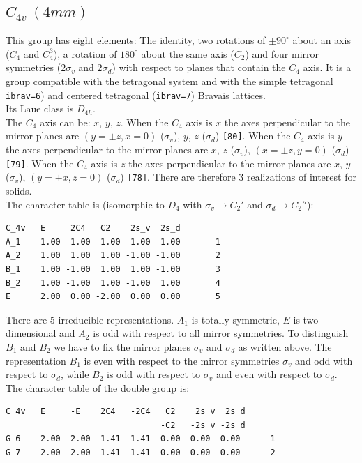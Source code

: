 \documentclass[12pt,a4paper]{article}
\begin{document}
\subsection{\color{web-blue}$C_{4v}\ (4mm)$} 
This group has eight elements: The identity, two rotations of $\pm90^\circ$ 
about an axis ($C_4$ and $C_4^3$), a rotation of $180^\circ$ about the same axis 
($C_2$) and four mirror symmetries ($2\sigma_v$ and $2 \sigma_d$) with respect
to planes that contain the $C_4$ axis.
It is a group compatible with the tetragonal system and with the  
simple tetragonal \texttt{ibrav=6}) and centered tetragonal (\texttt{ibrav=7}) 
Bravais lattices. \\ 
Its Laue class is $D_{4h}$. \\
The $C_4$ axis can be: $x$, $y$, $z$. When the $C_4$ axis is $x$ the axes
perpendicular to the mirror planes are $(y=\pm z, x=0)$ ($\sigma_v$), 
$y$, $z$ ($\sigma_d$) \texttt{[80]}. When the $C_4$ axis is $y$
the axes perpendicular to the mirror planes are $x$, $z$ ($\sigma_v$),
$(x=\pm z, y=0)$ ($\sigma_d$) \texttt{[79]}. When the 
$C_4$ axis is $z$ the axes perpendicular to the mirror planes are $x$, $y$
($\sigma_v$), $(y=\pm x, z=0)$ ($\sigma_d$) \texttt{[78]}.
There are therefore $3$ realizations of interest for solids. \\
The character table is (isomorphic to $D_4$ with $\sigma_v \rightarrow C_2'$
and $\sigma_d \rightarrow C_2''$):
\begin{verbatim}
C_4v   E     2C4   C2    2s_v  2s_d 
A_1    1.00  1.00  1.00  1.00  1.00       1
A_2    1.00  1.00  1.00 -1.00 -1.00       2
B_1    1.00 -1.00  1.00  1.00 -1.00       3
B_2    1.00 -1.00  1.00 -1.00  1.00       4
E      2.00  0.00 -2.00  0.00  0.00       5
\end{verbatim}
There are 5 irreducible representations. $A_1$ is totally symmetric, $E$ is
two dimensional and $A_2$ is odd with respect to all mirror symmetries.
To distinguish $B_1$ and $B_2$ we have to fix the mirror planes
$\sigma_v$ and $\sigma_d$ as written above. 
The representation $B_1$ is even with respect to the mirror symmetries
$\sigma_v$ and odd with respect to $\sigma_d$, while $B_2$ is odd with respect to
$\sigma_v$ and even with respect to $\sigma_d$. \\
The character table of the double group is:
\begin{verbatim}
C_4v   E     -E    2C4   -2C4   C2    2s_v  2s_d
                               -C2   -2s_v -2s_d
G_6    2.00 -2.00  1.41 -1.41  0.00  0.00  0.00      1
G_7    2.00 -2.00 -1.41  1.41  0.00  0.00  0.00      2
\end{verbatim}
\end{document}
